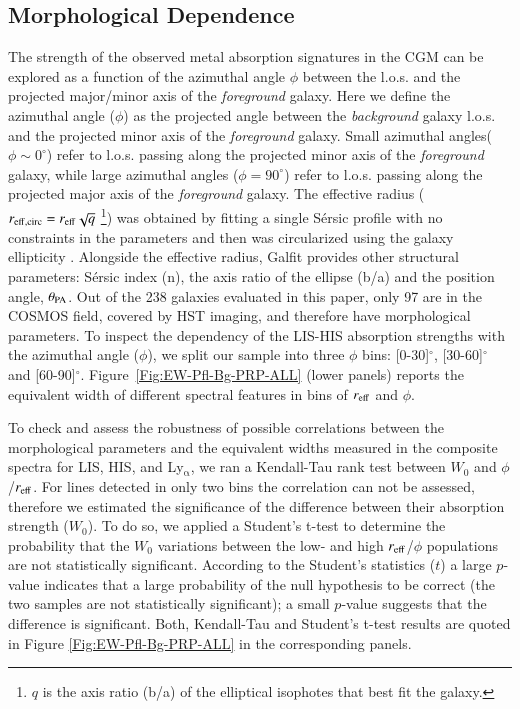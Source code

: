 \documentclass[longauth]{aa}
\begin{document}
\subsection{Morphological Dependence}\label{sec:EW-Mrph}

The strength of the observed metal absorption signatures in the CGM can be
explored as a function of the azimuthal angle $\phi$ between the l.o.s. and
the projected major/minor axis of the
\textit{foreground} galaxy. Here we define the azimuthal angle ($\phi$) as the
projected angle between the \textit{background} galaxy l.o.s. and the
projected minor axis of the \textit{foreground} galaxy. Small azimuthal
angles($\phi\sim0^{\circ}$) refer to l.o.s. passing along the projected
minor axis of the \textit{foreground} galaxy, while large azimuthal angles
($\phi=90^{\circ}$) refer to l.o.s. passing along the projected major axis
of the \textit{foreground} galaxy. The effective radius ($r_{\rm
{eff, circ}}=r_{\rm{eff}}\sqrt{q}$ 
\footnote{$q$ is the axis ratio (b/a) of the elliptical isophotes that best
fit the galaxy.}) was obtained by fitting a single S\'ersic profile with no
constraints in the parameters and then was circularized using the galaxy
ellipticity \citep{Ribeiro16}. Alongside the effective radius, {\sc Galfit}
provides other structural parameters: S\'ersic index (n), the axis ratio of
the ellipse (b/a) and the position angle, $\theta_{\rm{PA}}$. Out of the 238
galaxies evaluated in this paper, only 97 are in the COSMOS field, covered
by HST imaging, and therefore have morphological parameters. To inspect the
dependency of the LIS-HIS absorption strengths with the azimuthal angle
($\phi$), we split our sample into three $\phi$ bins: [0-30]$^{\circ}$,
[30-60]$^{\circ}$ and [60-90]$^{\circ}$. Figure~\ref{Fig:EW-Pfl-Bg-PRP-ALL}
(lower panels) reports the equivalent width of different spectral features
in bins of $r_{\rm{eff}}$ and $\phi$.

To check and assess the robustness of possible correlations between the
morphological parameters and the equivalent widths measured in the composite
spectra for LIS, HIS, and Ly$_{\upalpha}$, we ran a Kendall-Tau rank test
between $W_{0}$ and $\phi$/$r_{\rm{eff}}$. For lines detected in only two
bins  the correlation can not be assessed, therefore we estimated the
significance of the difference between their absorption strength ($W_
{0}$). To do so, we applied a Student's t-test to determine the probability
that the $W_{0}$ variations between the low- and high $r_{\rm
{eff}}$/$\phi$ populations are not statistically significant. According to
the Student's statistics ($t$) a large $p$-value indicates that a large
probability of the null hypothesis to be correct (the two samples are not
statistically significant); a small $p$-value suggests that the difference is
significant. Both, Kendall-Tau and Student's t-test results are quoted in
Figure \ref{Fig:EW-Pfl-Bg-PRP-ALL} in the corresponding panels. 
\end{document}
